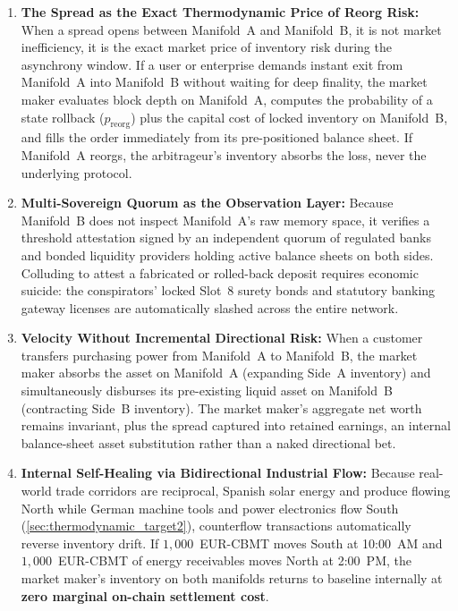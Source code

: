 \documentclass[a4paper,11pt,twoside,parskip=half-,headings=small]{scrartcl}
\begin{document}
\clearpage
\begin{enumerate}[nosep]
  \item \textbf{The Spread as the Exact Thermodynamic Price of Reorg Risk:} When a spread opens between Manifold~A and Manifold~B, it is not market inefficiency, it is the exact market price of inventory risk during the asynchrony window. If a user or enterprise demands instant exit from Manifold~A into Manifold~B without waiting for deep finality, the market maker evaluates block depth on Manifold~A, computes the probability of a state rollback ($p_{\text{reorg}}$) plus the capital cost of locked inventory on Manifold~B, and fills the order immediately from its pre-positioned balance sheet. If Manifold~A reorgs, the arbitrageur's inventory absorbs the loss, never the underlying protocol.
  \item \textbf{Multi-Sovereign Quorum as the Observation Layer:} Because Manifold~B does not inspect Manifold~A's raw memory space, it verifies a threshold attestation signed by an independent quorum of regulated banks and bonded liquidity providers holding active balance sheets on both sides. Colluding to attest a fabricated or rolled-back deposit requires economic suicide: the conspirators' locked Slot~8 surety bonds and statutory banking gateway licenses are automatically slashed across the entire network.
  \item \textbf{Velocity Without Incremental Directional Risk:} When a customer transfers purchasing power from Manifold~A to Manifold~B, the market maker absorbs the asset on Manifold~A (expanding Side~A inventory) and simultaneously disburses its pre-existing liquid asset on Manifold~B (contracting Side~B inventory). The market maker's aggregate net worth remains invariant, plus the spread captured into retained earnings, an internal balance-sheet asset substitution rather than a naked directional bet.
  \item \textbf{Internal Self-Healing via Bidirectional Industrial Flow:} Because real-world trade corridors are reciprocal, Spanish solar energy and produce flowing North while German machine tools and power electronics flow South (\cref{sec:thermodynamic_target2}), counterflow transactions automatically reverse inventory drift. If $1{,}000$~EUR-CBMT moves South at 10:00~AM and $1{,}000$~EUR-CBMT of energy receivables moves North at 2:00~PM, the market maker's inventory on both manifolds returns to baseline internally at \textbf{zero marginal on-chain settlement cost}.

\end{enumerate}
\end{document}
